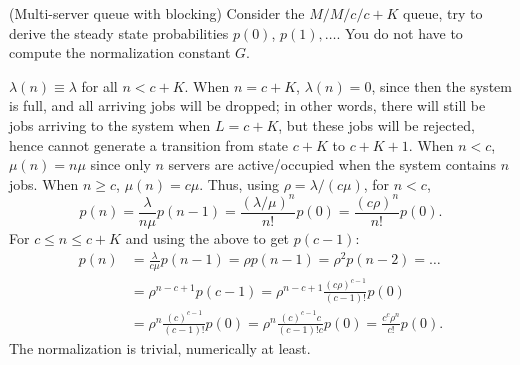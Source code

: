 \begin{question}(Multi-server queue with blocking) Consider the
  $M/M/c/c+K$ queue, try to derive the steady state probabilities
  $p(0)$, $p(1), \ldots$. You do not have to compute the normalization
  constant $G$.


  \begin{solution}
    $\lambda(n) \equiv \lambda$ for all $n<c+K$. When $n=c+K$,
    $\lambda(n)=0$, since then the system is full, and all arriving
    jobs will be dropped; in other words, there will still be jobs
    arriving to the system when $L=c+K$, but these jobs will be
    rejected, hence cannot generate a transition from state $c+K$ to
    $c+K+1$.  When $n<c$, $\mu(n)=n \mu$ since only $n$ servers
    are active/occupied when the system contains $n$ jobs. When
    $n\geq c$, $\mu(n) = c \mu$. Thus, using $\rho=\lambda/(c\mu)$, for $n<c$,
     \begin{equation*}
      p(n) = \frac{\lambda}{n\mu} p(n-1) = \frac{(\lambda/\mu)^n}{n!} p(0)=\frac{(c\rho)^n}{n!}p(0).
     \end{equation*}
For $c\leq n\leq c+K$ and using the above to get $p(c-1)$:
 \begin{equation*}
   \begin{split}
 p(n) &= \frac{\lambda}{c\mu} p(n-1) 
= \rho p(n-1) = \rho^2 p(n-2) = \ldots\\
&=\rho^{n-c+1} p(c-1) 
=\rho^{n-c+1} \frac{(c\rho)^{c-1}}{(c-1)!}p(0)\\
&=\rho^{n} \frac{(c)^{c-1}}{(c-1)!}p(0) 
=\rho^{n} \frac{(c)^{c-1}c}{(c-1)!c}p(0) =\frac{c^c \rho^n}{c!} p(0).
   \end{split}
 \end{equation*}
The normalization is trivial, numerically at least.
  \end{solution}
\end{question}

